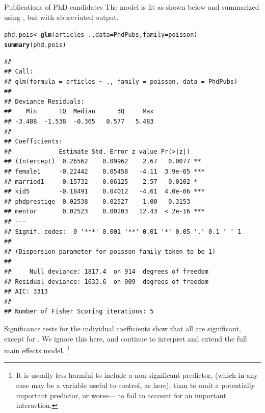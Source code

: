 \documentclass[11pt]{book}\usepackage[]{graphicx}\usepackage[]{color}
\makeatletter
\newcommand{\hlopt}[1]{\textcolor[rgb]{0,0,0}{#1}}%
\newcommand{\hlstd}[1]{\textcolor[rgb]{0.345,0.345,0.345}{#1}}%
\newcommand{\hlkwb}[1]{\textcolor[rgb]{0.69,0.353,0.396}{#1}}%
\newcommand{\hlkwc}[1]{\textcolor[rgb]{0.333,0.667,0.333}{#1}}%
\newcommand{\hlkwd}[1]{\textcolor[rgb]{0.737,0.353,0.396}{\textbf{#1}}}%
\newenvironment{kframe}{%
 \def\at@end@of@kframe{}%
 \ifinner\ifhmode%
  \def\at@end@of@kframe{\end{minipage}}%
  \begin{minipage}{\columnwidth}%
 \fi\fi%
 \def\FrameCommand##1{\hskip\@totalleftmargin \hskip-\fboxsep
 \colorbox{shadecolor}{##1}\hskip-\fboxsep
     \hskip-\linewidth \hskip-\@totalleftmargin \hskip\columnwidth}%
 \MakeFramed {\advance\hsize-\width
   \@totalleftmargin\z@ \linewidth\hsize
   \@setminipage}}%
 {\par\unskip\endMakeFramed%
 \at@end@of@kframe}
\newenvironment{knitrout}{}{} %
\renewenvironment{knitrout}{\small\renewcommand{\baselinestretch}{.85}}{} %
\makeatother
\begin{document}
\begin{Example}[phdpubs1]{Publications of PhD candidates}
The model is fit as shown below and summarized using , but with abbreviated output.
\begin{knitrout}
\color{fgcolor}\begin{kframe}
\begin{alltt}
\hlstd{phd.pois} \hlkwb{<-} \hlkwd{glm}\hlstd{(articles} \hlopt{~} \hlstd{.,} \hlkwc{data}\hlstd{=PhdPubs,} \hlkwc{family}\hlstd{=poisson)}
\hlkwd{summary}\hlstd{(phd.pois)}
\end{alltt}
\begin{verbatim}
## 
## Call:
## glm(formula = articles ~ ., family = poisson, data = PhdPubs)
## 
## Deviance Residuals: 
##    Min      1Q  Median      3Q     Max  
## -3.488  -1.538  -0.365   0.577   5.483  
## 
## Coefficients:
##             Estimate Std. Error z value Pr(>|z|)    
## (Intercept)  0.26562    0.09962    2.67   0.0077 ** 
## female1     -0.22442    0.05458   -4.11  3.9e-05 ***
## married1     0.15732    0.06125    2.57   0.0102 *  
## kid5        -0.18491    0.04012   -4.61  4.0e-06 ***
## phdprestige  0.02538    0.02527    1.00   0.3153    
## mentor       0.02523    0.00203   12.43  < 2e-16 ***
## ---
## Signif. codes:  0 '***' 0.001 '**' 0.01 '*' 0.05 '.' 0.1 ' ' 1
## 
## (Dispersion parameter for poisson family taken to be 1)
## 
##     Null deviance: 1817.4  on 914  degrees of freedom
## Residual deviance: 1633.6  on 909  degrees of freedom
## AIC: 3313
## 
## Number of Fisher Scoring iterations: 5
\end{verbatim}
\end{kframe}
\end{knitrout}
Significance tests for the individual coefficients show that all are significant,
except for .  We ignore this here, and continue to interpret and
extend the full main effects model.%
\footnote{
It is usually less harmful to include a non-significant predictor,
(which in any case may be a variable useful to control, as  here), than to omit a
potentially important predictor, or worse--- to fail to account for an important interaction.
}


\end{Example}
\end{document}
